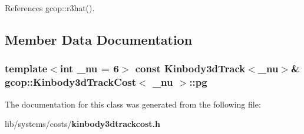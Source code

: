 \-References gcop\-::r3hat().



\subsection{\-Member \-Data \-Documentation}
\subsubsection[{pg}]{\setlength{\rightskip}{0pt plus 5cm}template$<$int \-\_\-nu = 6$>$ const {\bf \-Kinbody3d\-Track}$<$\-\_\-nu$>$\& {\bf gcop\-::\-Kinbody3d\-Track\-Cost}$<$ \-\_\-nu $>$\-::{\bf pg}}\label{classgcop_1_1Kinbody3dTrackCost_ae121790172f3a845a6502cc5691a64ec}


\-The documentation for this class was generated from the following file\-:\begin{DoxyCompactItemize}
\item 
lib/systems/costs/{\bf kinbody3dtrackcost.\-h}\end{DoxyCompactItemize}
